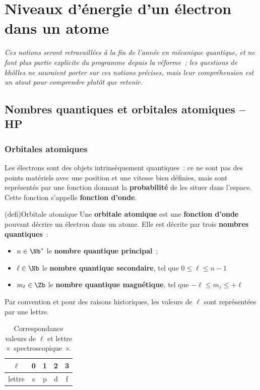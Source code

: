 \documentclass[../../main/main.tex]{subfiles}
\begin{document}
\section{Niveaux d'énergie d'un électron dans un atome}
\begin{center}
	\itshape
	Ces notions seront retravaillées à la fin de l'année en mécanique quantique,
	et ne font plus partie explicite du programme depuis la réforme~; les
	questions de khôlles ne sauraient porter sur ces notions précises, mais leur
	compréhension est un atout pour comprendre plutôt que retenir.
\end{center}

\subsection{Nombres quantiques et orbitales atomiques -- HP}
\subsubsection{Orbitales atomiques}

Les électrons sont des objets intrinsèquement quantiques~: ce ne sont pas des
points matériels avec une position et une vitesse bien définies, mais sont
représentés par une fonction donnant la \textbf{probabilité} de les situer dans
l'espace. Cette fonction s'appelle \textbf{fonction d'onde}.

\begin{tcb*}(defi){Orbitale atomique}
	Une \textbf{orbitale atomique} est une \textbf{fonction d'onde} pouvant
	décrire un électron dans un atome. Elle est décrite par trois
	\textbf{nombres quantiques}~:
	\begin{itemize}
		\item $n \in \Nb^*$ le \textbf{nombre quantique principal}~;
		\item $\ell \in \Nb$ le \textbf{nombre quantique secondaire}, tel que
		      \hfill
		      $0\leq\ell\leq n-1 \qquad$
		\item $m_{\ell} \in \Zb$ le \textbf{nombre quantique magnétique}, tel
		      que
		      \hfill
		      $-\ell \leq m_{\ell} \leq +\ell \qquad$
	\end{itemize}
\end{tcb*}

Par convention et pour des raisons historiques, les valeurs de $\ell$ sont
représentées par une lettre.

\begin{table}[ht]
	\centering
	\caption{Correspondance valeurs de $\ell$ et lettre «~spectroscopique~».}
	\label{tab:lspectro}
	\begin{tabular}{ccccc}
		\toprule
		$\ell$             & 0 & 1 & 2 & 3
		\\\midrule
		\RaggedLeft lettre & s & p & d & f
		\\\bottomrule
	\end{tabular}
\end{table}
\end{document}
